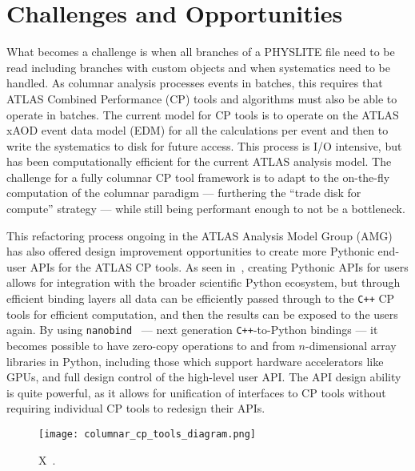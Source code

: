\section{Challenges and Opportunities}\label{sec:challenges}

What becomes a challenge is when all branches of a PHYSLITE file need to be read including branches with custom objects and when systematics need to be handled.
As columnar analysis processes events in batches, this requires that ATLAS Combined Performance (CP) tools and algorithms must also be able to operate in batches.
The current model for CP tools is to operate on the ATLAS xAOD event data model (EDM) for all the calculations per event and then to write the systematics to disk for future access.
This process is I/O intensive, but has been computationally efficient for the current ATLAS analysis model.
The challenge for a fully columnar CP tool framework is to adapt to the on-the-fly computation of the columnar paradigm --- furthering the ``trade disk for compute'' strategy --- while still being performant enough to not be a bottleneck.

This refactoring process ongoing in the ATLAS Analysis Model Group (AMG) has also offered design improvement opportunities to create more Pythonic end-user APIs for the ATLAS CP tools.
As seen in~, creating Pythonic APIs for users allows for integration with the broader scientific Python ecosystem, but through efficient binding layers all data can be efficiently passed through to the \texttt{C++} CP tools for efficient computation, and then the results can be exposed to the users again.
By using \texttt{nanobind}~\cite{nanobind} --- next generation \texttt{C++}-to-Python bindings --- it becomes possible to have zero-copy operations to and from $n$-dimensional array libraries in Python, including those which support hardware accelerators like GPUs, and full design control of the high-level user API.
The API design ability is quite powerful, as it allows for unification of interfaces to CP tools without requiring individual CP tools to redesign their APIs.

\begin{figure}
    \centering
    \texttt{[image: columnar\_cp\_tools\_diagram.png]}
    \caption{X~\cite{Vigl:ACAT_2024}.}
    \label{fig:columnar_cp_tools_diagram}
\end{figure}
